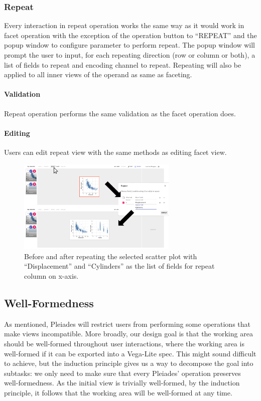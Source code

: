 \documentclass[journal]{vgtc}                %
\begin{document}
\subsubsection{Repeat}
Every interaction in repeat operation works the same way as it would work in
facet operation with the exception of the operation button to “REPEAT” and the
popup window to configure parameter to perform repeat. The popup window will prompt
the user to input, for each repeating direction (row or column or both), a list of
fields to repeat and encoding channel to repeat. Repeating will also be applied to
all inner views of the operand as same as faceting.

\paragraph{Validation} Repeat operation performs the same validation as the facet
operation does.

\paragraph{Editing} Users can edit repeat view with the same methods as editing facet view.

\begin{figure}[htb]
 \centering
 \includegraphics[width=3in]{repeat.png}
 \caption{Before and after repeating the selected scatter plot with ``Displacement'' and ``Cylinders'' as the list of fields for repeat column on x-axis.}
\end{figure}

\subsection{Well-Formedness}
As mentioned, Pleiades will restrict users from performing some operations that
make views incompatible. More broadly, our design goal is that the working area
should be well-formed throughout user interactions, where the working area is
well-formed if it can be exported into a Vega-Lite spec. This might sound difficult
to achieve, but the induction principle gives us a way to decompose the goal into
subtasks: we only need to make sure that every Pleiades’ operation preserves
well-formedness. As the initial view is trivially well-formed, by the induction
principle, it follows that the working area will be well-formed at any time.
\end{document}
